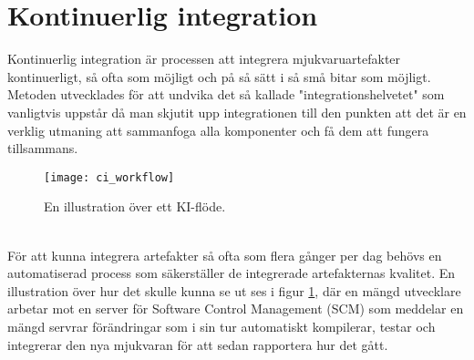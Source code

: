 \section{Kontinuerlig integration}
Kontinuerlig integration är processen att integrera mjukvaruartefakter  kontinuerligt,
så ofta som möjligt och på så sätt i så små bitar som möjligt.
Metoden utvecklades för att undvika det så kallade "integrationshelvetet" som
vanligtvis uppstår då man skjutit upp integrationen till den punkten att det är en verklig utmaning att
sammanfoga alla komponenter och få dem att fungera tillsammans. \cite{continous_integration}

\begin{figure}[h]
  \centering
  \texttt{[image: ci\_workflow]}
  \caption{En illustration över ett KI-flöde.}
  \label{fig:ci_workflow}
\end{figure}
\ \\
För att kunna integrera artefakter så ofta som flera gånger per dag behövs en automatiserad process
som säkerställer de integrerade artefakternas kvalitet. En illustration över hur det skulle kunna se ut ses i figur \ref{fig:ci_workflow},
där en mängd utvecklare arbetar mot en server för Software Control Management (SCM) som meddelar en mängd servrar förändringar som i sin tur automatiskt kompilerar,
testar och integrerar den nya mjukvaran för att sedan rapportera hur det gått.

